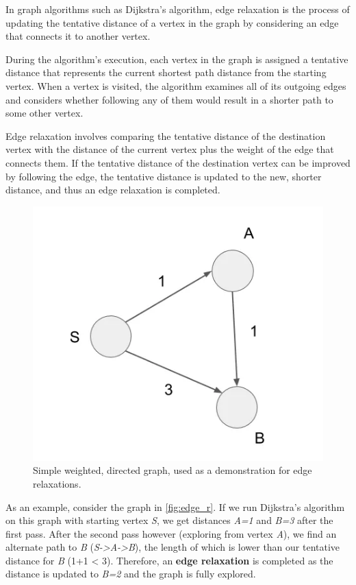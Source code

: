 \documentclass{l4proj}
\begin{document}
In graph algorithms such as Dijkstra's algorithm, edge relaxation is the process of updating the tentative distance of a vertex in the graph by considering an edge that connects it to another vertex.

During the algorithm's execution, each vertex in the graph is assigned a tentative distance that represents the current shortest path distance from the starting vertex. When a vertex is visited, the algorithm examines all of its outgoing edges and considers whether following any of them would result in a shorter path to some other vertex.

Edge relaxation involves comparing the tentative distance of the destination vertex with the distance of the current vertex plus the weight of the edge that connects them. If the tentative distance of the destination vertex can be improved by following the edge, the tentative distance is updated to the new, shorter distance, and thus an edge relaxation is completed. 

\begin{figure}[!h]
    \centering
    \includegraphics[width=0.6\linewidth]{images/edge_relaxation.png}    
    \caption[Caption]{Simple weighted, directed graph, used as a demonstration for edge relaxations. \footnotemark}
    \label{fig:edge_r} 
\end{figure}


As an example, consider the graph in \autoref{fig:edge_r}. If we run Dijkstra's algorithm on this graph with starting vertex \emph{S}, we get distances \emph{A=1} and \emph{B=3} after the first pass. After the second pass however (exploring from vertex \emph{A}), we find an alternate path to \emph{B} (\emph{S->A->B}), the length of which is lower than our tentative distance for \emph{B} (1+1 < 3). Therefore, an \textbf{edge relaxation} is completed as the distance is updated to \emph{B=2} and the graph is fully explored.
\end{document}
